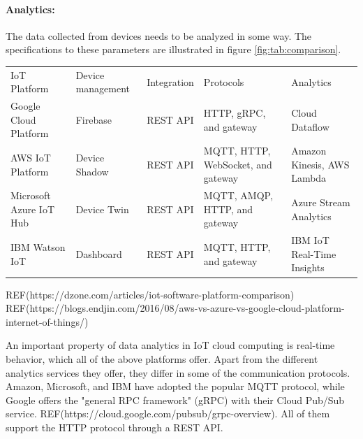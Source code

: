\paragraph{Analytics:} The data collected from devices needs to be analyzed in some way.
The specifications to these parameters are illustrated in figure \ref{fig:tab:comparison}.

\begin{center}
	\begin{tabular}{ | p{2cm} | p{2cm} | p{2cm} | p{2cm} | p{2cm} | }
		\hline
		IoT \newline Platform & Device \newline management & Integration & Protocols & Analytics \\ 
		\hiderowcolors
		\hline
		\cellcolor[gray]{0.9}
		Google Cloud \newline Platform & Firebase & REST API & HTTP, gRPC, \newline and gateway & Cloud Dataflow \\ 
		\hline
		\cellcolor[gray]{0.9}
		AWS IoT \newline Platform & Device Shadow & REST API & MQTT, HTTP, WebSocket, \newline and gateway & Amazon Kinesis, \newline AWS Lambda \\
		\hline
		\cellcolor[gray]{0.9}
		Microsoft Azure \newline IoT Hub & Device Twin & REST API & MQTT, AMQP, HTTP, \newline and gateway & Azure Stream \newline Analytics \\
		\hline
		\cellcolor[gray]{0.9}
		IBM Watson IoT & Dashboard & REST API & MQTT, HTTP, \newline and gateway & IBM IoT \newline Real-Time Insights \\
		\hline
	\end{tabular}
	\label{fig:tab:comparison}
\end{center}
REF(https://dzone.com/articles/iot-software-platform-comparison)
REF(https://blogs.endjin.com/2016/08/aws-vs-azure-vs-google-cloud-platform-internet-of-things/)

An important property of data analytics in IoT cloud computing is real-time behavior, which all of the above platforms offer. Apart from the different analytics services they offer, they differ in some of the communication protocols. Amazon, Microsoft, and IBM have adopted the popular MQTT protocol, while Google offers the "general RPC framework" (gRPC) with their Cloud Pub/Sub service. REF(https://cloud.google.com/pubsub/grpc-overview). All of them support the HTTP protocol through a REST API. 

